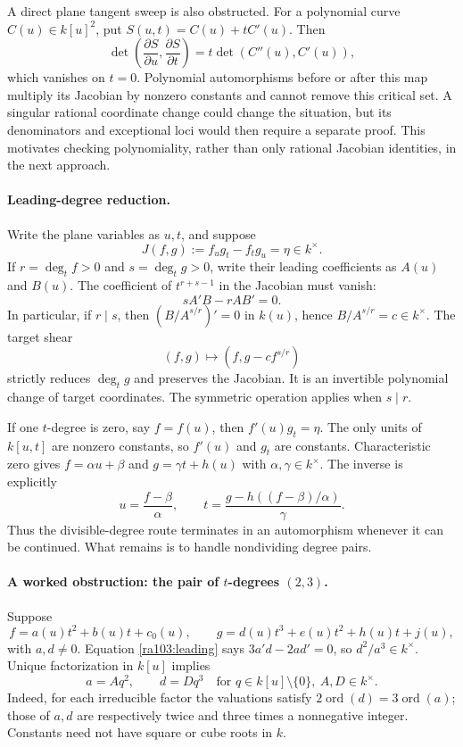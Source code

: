 \documentclass[11pt]{article}
\begin{document}
A direct plane tangent sweep is also obstructed. For a polynomial curve
$C(u)\in k[u]^2$, put $S(u,t)=C(u)+tC'(u)$. Then
\[
 \det\left(\frac{\partial S}{\partial u},
           \frac{\partial S}{\partial t}\right)
     =t\det(C''(u),C'(u)),
\]
which vanishes on $t=0$. Polynomial automorphisms before or after this map
multiply its Jacobian by nonzero constants and cannot remove this critical
set. A singular rational coordinate change could change the situation, but
its denominators and exceptional loci would then require a separate proof.
This motivates checking polynomiality, rather than only rational Jacobian
identities, in the next approach.

\paragraph{Leading-degree reduction.}
Write the plane variables as $u,t$, and suppose
\[
 J(f,g):=f_u g_t-f_t g_u=\eta\in k^\times.
\]
If $r=\deg_t f>0$ and $s=\deg_t g>0$, write their leading coefficients as
$A(u)$ and $B(u)$. The coefficient of $t^{r+s-1}$ in the Jacobian must vanish:
\begin{equation}\label{ra103:leading}
 sA'B-rAB'=0.
\end{equation}
In particular, if $r\mid s$, then
$(B/A^{s/r})'=0$ in $k(u)$, hence $B/A^{s/r}=c\in k^\times$.
The target shear
\begin{equation}\label{ra103:shear}
 (f,g)\longmapsto(f,g-cf^{s/r})
\end{equation}
strictly reduces $\deg_t g$ and preserves the Jacobian. It is an invertible
polynomial change of target coordinates. The symmetric operation applies
when $s\mid r$.

If one $t$-degree is zero, say $f=f(u)$, then $f'(u)g_t=\eta$. The only
units of $k[u,t]$ are nonzero constants, so $f'(u)$ and $g_t$ are constants.
Characteristic zero gives
$f=\alpha u+\beta$ and $g=\gamma t+h(u)$ with
$\alpha,\gamma\in k^\times$. The inverse is explicitly
\[
 u=\frac{f-\beta}{\alpha},\qquad
 t=\frac{g-h((f-\beta)/\alpha)}{\gamma}.
\]
Thus the divisible-degree route terminates in an automorphism whenever it
can be continued. What remains is to handle nondividing degree pairs.

\paragraph{A worked obstruction: the pair of $t$-degrees $(2,3)$.}
Suppose
\[
 f=a(u)t^2+b(u)t+c_0(u),\qquad
 g=d(u)t^3+e(u)t^2+h(u)t+j(u),
\]
with $a,d\ne0$. Equation \eqref{ra103:leading} says $3a'd-2ad'=0$,
so $d^2/a^3\in k^\times$. Unique factorization in $k[u]$ implies
\[
 a=Aq^2,\qquad d=Dq^3
 \quad\text{for }q\in k[u]\setminus\{0\},\ A,D\in k^\times.
\]
Indeed, for each irreducible factor the valuations satisfy
$2\operatorname{ord}(d)=3\operatorname{ord}(a)$; those of $a,d$ are
respectively twice and three times a nonnegative integer. Constants need
not have square or cube roots in $k$.
\end{document}
